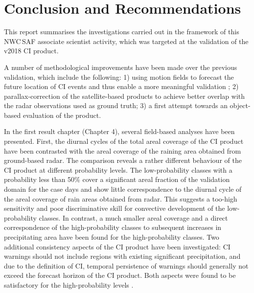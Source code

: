 \chapter{Conclusion and Recommendations}

This report summarises the investigations carried out in the framework of this NWC\,SAF associate scientist activity, which was targeted at the validation of the v2018 CI product. 

A number of methodological improvements have been made over the previous validation, which include the following: 1) using motion fields to forecast the future location of CI events and thus enable a more meaningful validation ; 2) parallax-correction of the satellite-based products to achieve better overlap with the radar observations used as ground truth; 3) a first attempt towards an object-based evaluation of the product. 

In the first result chapter (Chapter 4), several field-based analyses have been presented. First, the diurnal cycles of the total areal coverage of the CI product have been contrasted with the areal coverage of the raining area obtained from ground-based radar. 
{The comparison reveals a rather different behaviour of the CI product at different probability levels. The low-probability classes with a probability less than 50\% cover a significant areal fraction of the validation domain for the case days and show little correspondence to the diurnal cycle of the areal coverage of rain areas obtained from radar. This suggests a too-high sensitivity and poor discriminative skill for convective development of the low-probability classes.
In contrast, a much smaller areal coverage and a direct correspondence of the high-probability classes to subsequent increases in precipitating area have been found for the high-probability classes.} 
Two additional consistency aspects of the CI product have been investigated: CI warnings should not include regions with existing significant precipitation, and due to the definition of CI, temporal persistence of warnings should generally not exceed the forecast horizon of the CI product. Both aspects were found to be satisfactory for the high-probability levels .

